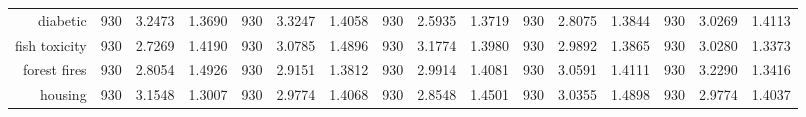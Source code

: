 \begin{table}[htbp]
{\begin{tabular}{rccccccccccccccc}
			diabetic                            & 930                                 & 3.2473                                                                    & 1.3690          & 930                            & 3.3247                                                                             & 1.4058          & 930                             & \cellcolor[rgb]{ .776,  .937,  .808}\textcolor[rgb]{ 0,  .38,  0}{2.5935} & 1.3719          & 930                             & 2.8075                                                                    & 1.3844          & 930                             & 3.0269          & 1.4113          \\
			fish toxicity                       & 930                                 & \cellcolor[rgb]{ .776,  .937,  .808}\textcolor[rgb]{ 0,  .38,  0}{2.7269} & 1.4190          & 930                            & 3.0785                                                                             & 1.4896          & 930                             & 3.1774                                                                    & 1.3980          & 930                             & 2.9892                                                                    & 1.3865          & 930                             & 3.0280          & 1.3373          \\
			forest fires                        & 930                                 & \cellcolor[rgb]{ .776,  .937,  .808}\textcolor[rgb]{ 0,  .38,  0}{2.8054} & 1.4926          & 930                            & 2.9151                                                                             & 1.3812          & 930                             & 2.9914                                                                    & 1.4081          & 930                             & 3.0591                                                                    & 1.4111          & 930                             & 3.2290          & 1.3416          \\
			housing                             & 930                                 & 3.1548                                                                    & 1.3007          & 930                            & 2.9774                                                                             & 1.4068          & 930                             & \cellcolor[rgb]{ .776,  .937,  .808}\textcolor[rgb]{ 0,  .38,  0}{2.8548} & 1.4501          & 930                             & 3.0355                                                                    & 1.4898          & 930                             & 2.9774          & 1.4037          \\

\end{tabular}}
\end{table}
